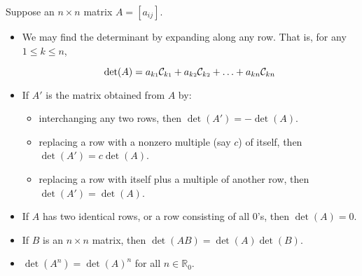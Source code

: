 \begin{theorem} \label{determinantprops} 
Suppose an $n \times n$ matrix $A = \left[a_{ij}\right]$.  
		
\begin{itemize}
			
\item  We may find the determinant by expanding along any row.  That is, for any $1 \leq k \leq n$, 
			
\[\det(A) = a_{k\mbox{\tiny$1$}}\mathcal{C}_{k\mbox{\tiny$1$}} +  a_{k\mbox{\tiny$2$}}\mathcal{C}_{k\mbox{\tiny$2$}} + \ldots + a_{kn} \mathcal{C}_{kn}\]
			
\item  If $A'$ is the matrix obtained from $A$ by:
			
\begin{itemize}
				
		\item interchanging any two rows, then $\det(A')=-\det(A)$.
				
		\item  replacing a row with a nonzero multiple (say $c$) of itself, then $\det(A')=c\det(A)$.
				
		\item  replacing a row with itself plus a multiple of another row, then $\det(A')=\det(A)$.
				
\end{itemize}
			
			\item  If $A$ has two identical rows, or a row consisting of all $0$'s, then $\det(A) = 0$.
			
			
			\item  If $B$ is an $n \times n$ matrix, then $\det(AB) = \det(A) \det(B)$.
			
			\item  $\det\left(A^{n}\right) = \det(A)^{n}$ for all $n \in \mathbb{R}_0$.
			
			
		\end{itemize}
		
\end{theorem}
	

